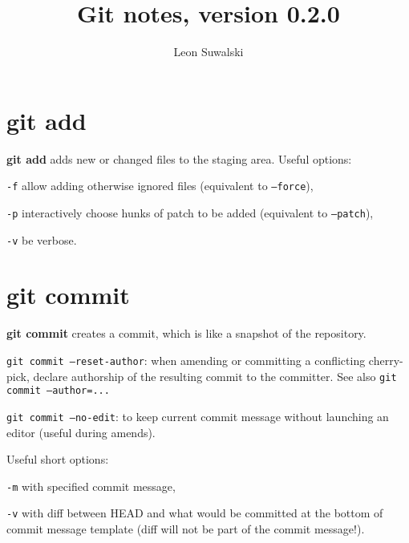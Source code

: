 \documentclass{charun}
\title{Git notes, version 0.2.0}
\author{Leon Suwalski}
\begin{document}
\begin{multicols*}{2}
\maketitle
\raggedright

\section{git add}
\textbf{git add} adds new or changed files to the staging area.
Useful options:
\begin{compactenum}
\item [\texttt{-f}] allow adding otherwise ignored files (equivalent to \texttt{--force}),
\item [\texttt{-p}] interactively choose hunks of patch to be added (equivalent to \texttt{--patch}),
\item [\texttt{-v}] be verbose.
\end{compactenum}

\section{git commit}
\textbf{git commit} creates a commit, which is like a snapshot of the repository.

\texttt{git commit --reset-author}: when amending or committing a conflicting cherry-pick, declare authorship of the resulting commit to the committer.
See also \texttt{git commit --author=...}

\texttt{git commit --no-edit}: to keep current commit message without launching an editor (useful during amends).

Useful short options:
\begin{compactenum}
\item [\texttt{-m}] with specified commit message,
\item [\texttt{-v}] with diff between HEAD and what would be committed at the bottom of commit message template (diff will not be part of the commit message!).
\end{compactenum}


\end{multicols*}
\end{document}
